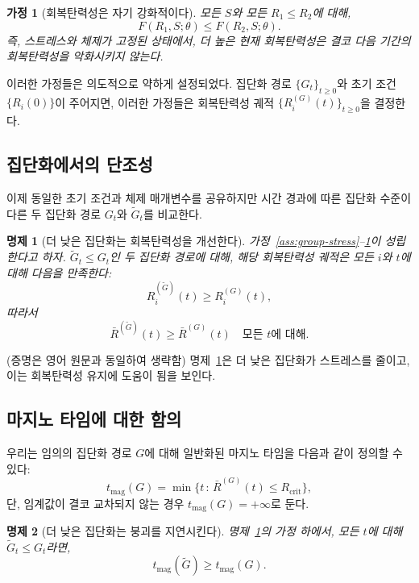 \documentclass[11pt]{article}
\theoremstyle{plain}
\newtheorem{assumption}{가정}
\newtheorem{proposition}{명제}
\begin{document}
\begin{assumption}[회복탄력성은 자기 강화적이다]
\label{ass:res-monotone}
모든 $S$와 모든 $R_1 \le R_2$에 대해,
\[
F(R_1,S;\theta) \le F(R_2,S;\theta).
\]
즉, 스트레스와 체제가 고정된 상태에서, 더 높은 현재 회복탄력성은 결코 다음 기간의 회복탄력성을 악화시키지 않는다.
\end{assumption}

이러한 가정들은 의도적으로 약하게 설정되었다. 집단화 경로 $\{G_t\}_{t\ge 0}$와 초기 조건 $\{R_i(0)\}$이 주어지면, 이러한 가정들은 회복탄력성 궤적 $\{R_i^{(G)}(t)\}_{t\ge 0}$을 결정한다.

\subsection{집단화에서의 단조성}

이제 동일한 초기 조건과 체제 매개변수를 공유하지만 시간 경과에 따른 집단화 수준이 다른 두 집단화 경로 $G_t$와 $\tilde{G}_t$를 비교한다.

\begin{proposition}[더 낮은 집단화는 회복탄력성을 개선한다]
\label{prop:grouping}
가정~\ref{ass:group-stress}--\ref{ass:res-monotone}이 성립한다고 하자.
$\tilde{G}_t \le G_t$인 두 집단화 경로에 대해, 해당 회복탄력성 궤적은 모든 $i$와 $t$에 대해 다음을 만족한다:
\[
R_i^{(\tilde{G})}(t) \ge R_i^{(G)}(t),
\]
따라서
\[
\bar{R}^{(\tilde{G})}(t) \ge \bar{R}^{(G)}(t) \quad \text{모든 } t \text{에 대해}.
\]
\end{proposition}

(증명은 영어 원문과 동일하여 생략함)
명제~\ref{prop:grouping}은 더 낮은 집단화가 스트레스를 줄이고, 이는 회복탄력성 유지에 도움이 됨을 보인다.

\subsection{마지노 타임에 대한 함의}

우리는 임의의 집단화 경로 $G$에 대해 일반화된 마지노 타임을 다음과 같이 정의할 수 있다:
\[
t_{\text{mag}}(G) = \min\{ t \,:\, \bar{R}^{(G)}(t) \le R_{\text{crit}}\},
\]
단, 임계값이 결코 교차되지 않는 경우 $t_{\text{mag}}(G) = +\infty$로 둔다.

\begin{proposition}[더 낮은 집단화는 붕괴를 지연시킨다]
\label{prop:maginot}
명제~\ref{prop:grouping}의 가정 하에서, 모든 $t$에 대해 $\tilde{G}_t \le G_t$라면,
\[
t_{\text{mag}}(\tilde{G}) \ge t_{\text{mag}}(G).
\]
\end{proposition}
\end{document}
